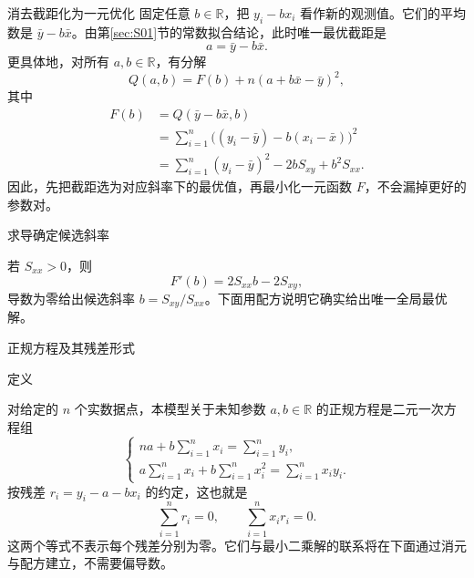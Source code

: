 \documentclass[aspectratio=169,10pt,fontset=fandol]{ctexbeamer}
\begin{document}
\begin{frame}[t,fragile]{消去截距化为一元优化}
\footnotesize
{\footnotesize
固定任意 $b\in\mathbb{R}$，把 $y_i-bx_i$ 看作新的观测值。它们的平均数是 $\bar{y}-b\bar{x}$。由第\ref{sec:S01}节的常数拟合结论，此时唯一最优截距是
\[
a=\bar{y}-b\bar{x}.
\]
更具体地，对所有 $a,b\in\mathbb{R}$，有分解
\[
Q(a,b)=F(b)+n(a+b\bar{x}-\bar{y})^2,
\]
其中
\[
\begin{aligned}
F(b)&=Q(\bar{y}-b\bar{x},b)\\
&=\sum_{i=1}^{n}\bigl((y_i-\bar{y})-b(x_i-\bar{x})\bigr)^2\\
&=\sum_{i=1}^{n}(y_i-\bar{y})^2-2bS_{xy}+b^2S_{xx}.
\end{aligned}
\]
因此，先把截距选为对应斜率下的最优值，再最小化一元函数 $F$，不会漏掉更好的参数对。
}
\end{frame}
\begin{frame}[t,fragile]{求导确定候选斜率}
\footnotesize
{\footnotesize
若 $S_{xx}>0$，则
\[
F'(b)=2S_{xx}b-2S_{xy},
\]
导数为零给出候选斜率 $b=S_{xy}/S_{xx}$。下面用配方说明它确实给出唯一全局最优解。\par

}
\end{frame}
\begin{frame}[t,fragile]{正规方程及其残差形式}
\footnotesize
\begin{block}{定义}
{\footnotesize
对给定的 $n$ 个实数据点，本模型关于未知参数 $a,b\in\mathbb{R}$ 的正规方程是二元一次方程组
\[
\begin{cases}
na+b\displaystyle\sum_{i=1}^{n}x_i=\displaystyle\sum_{i=1}^{n}y_i,\\
a\displaystyle\sum_{i=1}^{n}x_i+b\displaystyle\sum_{i=1}^{n}x_i^2=\displaystyle\sum_{i=1}^{n}x_i y_i.
\end{cases}
\]
按残差 $r_i=y_i-a-bx_i$ 的约定，这也就是
\[
\sum_{i=1}^{n}r_i=0,\qquad \sum_{i=1}^{n}x_i r_i=0.
\]
这两个等式不表示每个残差分别为零。它们与最小二乘解的联系将在下面通过消元与配方建立，不需要偏导数。

}
\end{block}
\end{frame}
\end{document}
